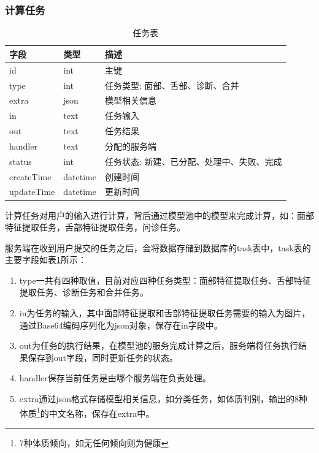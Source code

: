 \subsubsection{计算任务}
\begin{table}[]
    \centering
    \caption{任务表}
    \begin{tabular}{lll}
        \toprule
        字段 & 类型 & 描述 \\ 
        \midrule
        id & int & 主键 \\
        type & int & 任务类型: 面部、舌部、诊断、合并 \\ 
        extra & json & 模型相关信息 \\
        in & text & 任务输入 \\
        out & text & 任务结果 \\
        handler & text & 分配的服务端 \\
        status & int & 任务状态: 新建、已分配、处理中、失败、完成 \\
        createTime & datetime & 创建时间 \\
        updateTime & datetime & 更新时间\\
        \bottomrule
    \end{tabular}
    \label{tab:task}
\end{table}
计算任务对用户的输入进行计算，背后通过模型池中的模型来完成计算，如：面部特征提取任务，舌部特征提取任务，问诊任务。

服务端在收到用户提交的任务之后，会将数据存储到数据库的task表中，task表的主要字段如表\ref{tab:task}所示：
\begin{enumerate}
    
    \item type一共有四种取值，目前对应四种任务类型：面部特征提取任务、舌部特征提取任务、诊断任务和合并任务。

    \item in为任务的输入，其中面部特征提取和舌部特征提取任务需要的输入为图片，通过Base64编码序列化为json对象，保存在in字段中。

    \item out为任务的执行结果，在模型池的服务完成计算之后，服务端将任务执行结果保存到out字段，同时更新任务的状态。

    \item  handler保存当前任务是由哪个服务端在负责处理。

    \item extra通过json格式存储模型相关信息，如分类任务，如体质判别，输出的8种体质\footnote{7种体质倾向，如无任何倾向则为健康}的中文名称，保存在extra中。
\end{enumerate}

